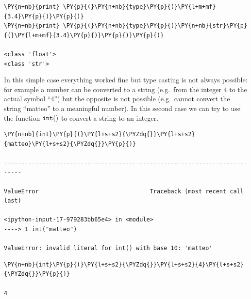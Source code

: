 \begin{tcolorbox}[breakable, size=fbox, boxrule=1pt, pad at break*=1mm, colback=cellbackground, colframe=cellborder]            
\begin{Verbatim}[commandchars=\\\{\}]
\PY{n+nb}{print} \PY{p}{(}\PY{n+nb}{type}\PY{p}{(}\PY{l+m+mf}{3.4}\PY{p}{)}\PY{p}{)}
\PY{n+nb}{print} \PY{p}{(}\PY{n+nb}{type}\PY{p}{(}\PY{n+nb}{str}\PY{p}{(}\PY{l+m+mf}{3.4}\PY{p}{)}\PY{p}{)}\PY{p}{)}

<class 'float'>
<class 'str'>
\end{Verbatim}
\end{tcolorbox}

In this simple case everything worked fine but type casting is not always possible: for example a number can be converted to a string (e.g.~from the integer 4 to the actual symbol ``4'') but the opposite is not possible (e.g.~cannot convert the string ``matteo'' to a meaningful number). In this second case we can try to use the function \(\tt{int()}\) to convert a string to an integer.

\begin{tcolorbox}[breakable, size=fbox, boxrule=1pt, pad at break*=1mm, colback=cellbackground, colframe=cellborder]            
\begin{Verbatim}[commandchars=\\\{\}]
\PY{n+nb}{int}\PY{p}{(}\PY{l+s+s2}{\PYZdq{}}\PY{l+s+s2}{matteo}\PY{l+s+s2}{\PYZdq{}}\PY{p}{)}

---------------------------------------------------------------------------

ValueError                                Traceback (most recent call last)

<ipython-input-17-979283bb65e4> in <module>
----> 1 int("matteo")  

ValueError: invalid literal for int() with base 10: 'matteo'
\end{Verbatim}
\end{tcolorbox}

\begin{tcolorbox}[breakable, size=fbox, boxrule=1pt, pad at break*=1mm, colback=cellbackground, colframe=cellborder]            
\begin{Verbatim}[commandchars=\\\{\}]
\PY{n+nb}{int}\PY{p}{(}\PY{l+s+s2}{\PYZdq{}}\PY{l+s+s2}{4}\PY{l+s+s2}{\PYZdq{}}\PY{p}{)}

4
\end{Verbatim}
\end{tcolorbox}

